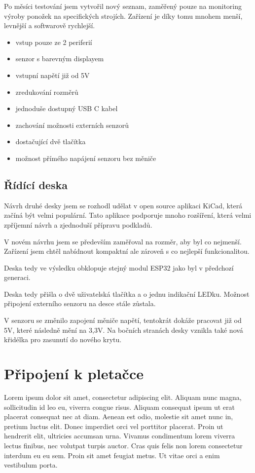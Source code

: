 Po měsíci testování jsem vytvořil nový seznam, zaměřený pouze na monitoring výroby ponožek na specifických strojích.
Zařízení je díky tomu mnohem menší, levnější a softwarově rychlejší.

\begin{itemize}
    \item vstup pouze ze 2 periferií
    \item senzor s barevným displayem
    \item vstupní napětí již od 5V
    \item zredukování rozměrů
    \item jednoduše dostupný USB C kabel
    \item zachování možnosti externích senzorů
    \item dostačující dvě tlačítka
    \item možnost přímého napájení senzoru bez měniče
\end{itemize}

\subsection{Řídící deska}
Návrh druhé desky jsem se rozhodl udělat v open source aplikaci KiCad, která začíná být velmi populární. 
Tato aplikace podporuje mnoho rozšíření, která velmi zpříjemní návrh a zjednoduší přípravu podkladů.

V novém návrhu jsem se především zaměřoval na rozměr, aby byl co nejmenší.
Zařízení jsem chtěl nabídnout kompaktní ale zároveň s co nejlepší funkcionalitou.

Deska tedy ve výsledku obklopuje stejný modul ESP32 jako byl v předchozí generaci.

Deska tedy přišla o dvě uživatelská tlačítka a o jednu indikační LEDku. 
Možnost připojení externího senzoru na desce stále zůstala.

V senzoru se změnilo zapojení měniče napětí, tentokrát dokáže pracovat již od 5V, které následně mění na 3,3V.
Na bočních stranách desky vznikla také nová křidélka pro zasunutí do nového krytu.

\fxnote[author=JA]{\textcolor{mygreen}{krabička popis, uchycení}}
\fxnote[author=JA]{\textcolor{mygreen}{Obrázek deksa => krabička}}

\section{Připojení k pletačce}
Lorem ipsum dolor sit amet, consectetur adipiscing elit.
Aliquam nunc magna, sollicitudin id leo eu, viverra congue risus.
Aliquam consequat ipsum ut erat placerat consequat nec at diam. 
Aenean est odio, molestie sit amet nunc in, pretium luctus elit. 
Donec imperdiet orci vel porttitor placerat. 
Proin ut hendrerit elit, ultricies accumsan urna. 
Vivamus condimentum lorem viverra lectus finibus, nec volutpat turpis auctor.
Cras quis felis non lorem consectetur interdum eu eu sem. 
Proin sit amet feugiat metus. 
Ut vitae orci a enim vestibulum porta. 


\newpage